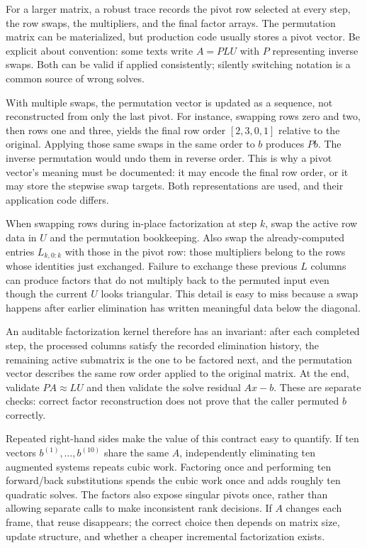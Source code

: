 For a larger matrix, a robust trace records the pivot row selected at every step, the row swaps, the multipliers, and the final factor arrays. The permutation matrix can be materialized, but production code usually stores a pivot vector. Be explicit about convention: some texts write \(A=PLU\) with \(P\) representing inverse swaps. Both can be valid if applied consistently; silently switching notation is a common source of wrong solves.

With multiple swaps, the permutation vector is updated as a sequence, not reconstructed from only the last pivot. For instance, swapping rows zero and two, then rows one and three, yields the final row order \([2,3,0,1]\) relative to the original. Applying those same swaps in the same order to \(b\) produces \(Pb\). The inverse permutation would undo them in reverse order. This is why a pivot vector's meaning must be documented: it may encode the final row order, or it may store the stepwise swap targets. Both representations are used, and their application code differs.

When swapping rows during in-place factorization at step \(k\), swap the active row data in \(U\) and the permutation bookkeeping. Also swap the already-computed entries \(L_{k,0:k}\) with those in the pivot row: those multipliers belong to the rows whose identities just exchanged. Failure to exchange these previous \(L\) columns can produce factors that do not multiply back to the permuted input even though the current \(U\) looks triangular. This detail is easy to miss because a swap happens after earlier elimination has written meaningful data below the diagonal.

An auditable factorization kernel therefore has an invariant: after each completed step, the processed columns satisfy the recorded elimination history, the remaining active submatrix is the one to be factored next, and the permutation vector describes the same row order applied to the original matrix. At the end, validate \(PA\approx LU\) and then validate the solve residual \(Ax-b\). These are separate checks: correct factor reconstruction does not prove that the caller permuted \(b\) correctly.

Repeated right-hand sides make the value of this contract easy to quantify. If ten vectors \(b^{(1)},\ldots,b^{(10)}\) share the same \(A\), independently eliminating ten augmented systems repeats cubic work. Factoring once and performing ten forward/back substitutions spends the cubic work once and adds roughly ten quadratic solves. The factors also expose singular pivots once, rather than allowing separate calls to make inconsistent rank decisions. If \(A\) changes each frame, that reuse disappears; the correct choice then depends on matrix size, update structure, and whether a cheaper incremental factorization exists.

